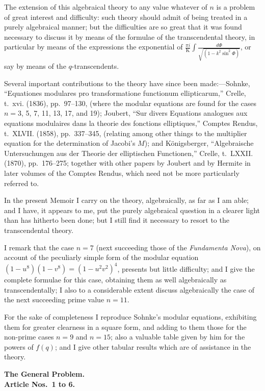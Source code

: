 \documentclass[11pt,a4paper]{article}
\theoremstyle{plain}
\begin{document}
The extension of this algebraical theory to any value whatever of $n$ is a problem of great interest and difficulty: such theory should admit of being treated in a purely algebraical manner; but the difficulties are so great that it was found necessary to discuss it by means of the formulae of the transcendental theory, in particular by means of the expressions the exponential of $\frac{\pi i}{\mathrm{K}}\int\frac{d\Phi}{\sqrt{(1 - k^2\sin^2\Phi)}}$, or say by means of the $q$-transcendents.

Several important contributions to the theory have since been made:---Sohnke, ``Equationes modulares pro transformatione functionum ellipticarum,'' Crelle, t.~xvi. (1836), pp.~97--130, (where the modular equations are found for the cases $n = 3$, 5, 7, 11, 13, 17, and 19); Joubert, ``Sur divers Equations analogues aux equations modulaires dans la theorie des fonctions elliptiques,'' Comptes Rendus, t.~XLVII. (1858), pp.~337--345, (relating among other things to the multiplier equation for the determination of Jacobi's $M$); and K\"onigsberger, ``Algebraische Untersuchungen aus der Theorie der elliptischen Functionen,'' Crelle, t.~LXXII. (1870), pp.~176--275; together with other papers by Joubert and by Hermite in later volumes of the Comptes Rendus, which need not be more particularly referred to.

In the present Memoir I carry on the theory, algebraically, as far as I am able; and I have, it appears to me, put the purely algebraical question in a clearer light than has hitherto been done; but I still find it necessary to resort to the transcendental theory.

I remark that the case $n = 7$ (next succeeding those of the \textit{Fundamenta Nova}), on account of the peculiarly simple form of the modular equation $(1 - u^8)(1 - v^8) = (1 - u^2v^2)^4$, presents but little difficulty; and I give the complete formulae for this case, obtaining them as well algebraically as transcendentally; I also to a considerable extent discuss algebraically the case of the next succeeding prime value $n = 11$.

For the sake of completeness I reproduce Sohnke's modular equations, exhibiting them for greater clearness in a square form, and adding to them those for the non-prime cases $n = 9$ and $n = 15$; also a valuable table given by him for the powers of $f(q)$; and I give other tabular results which are of assistance in the theory.

\medskip
\noindent\textbf{The General Problem.}\\
\textbf{Article Nos.~1 to 6.}
\end{document}
